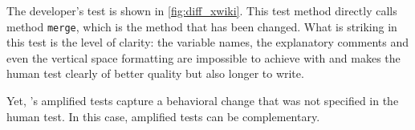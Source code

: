 The developer's test is shown in \autoref{fig:diff_xwiki}.
This test method directly calls method \texttt{merge}, which is the method that has been changed. 
What is striking in this test is the level of clarity: 
the variable names, the explanatory comments and even the vertical space formatting are impossible to achieve with \DCIA and makes the human test clearly of better quality but also longer to write.

Yet, \DCIA's amplified tests capture a behavioral change that was not specified in the human test.
In this case, amplified tests can be complementary.

\begin{figure}[h]
\centering
{}

\end{figure}
